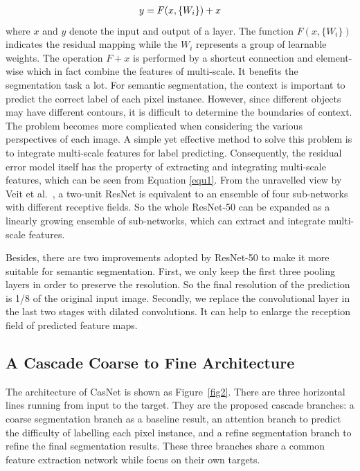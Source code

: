 \documentclass[10.5pt,compsoc]{TsT}
\newcommand{\upcite}[1]{\superscript{\textsuperscript{\cite{#1}}}}
\theoremstyle{mystyle}
\newcommand{\upcite}[1]{\textsuperscript{\cite{#1}}}
\begin{document}
{\begin{equation}\label{equ1}
\setlength\abovedisplayskip{4pt}
\setlength\belowdisplayskip{4pt}
\begin{split}
y = F(x, \{W_{i}\}) + x \\
\end{split}
\end{equation} 
where $x$ and $y$ denote the input and output of a layer. The function $F(x, \{W_{i}\})$ indicates the residual mapping while the $W_{i}$ represents a group of learnable weights. The operation $F + x$ is performed by a shortcut connection and element-wise which in fact combine the features of multi-scale. It benefits the segmentation task a lot. For semantic segmentation,  the context is important to predict the correct label of each pixel instance. However, since different objects may have different contours, it is difficult to determine the boundaries of context. The problem becomes more complicated when considering the various perspectives of each image. A simple yet effective method to solve this problem is to integrate multi-scale features for label predicting. Consequently, the residual error model itself has the property of extracting and integrating multi-scale features, which can be seen from Equation \ref {equ1}. From the unravelled view by Veit et al.~\upcite{22}, a two-unit ResNet is equivalent to an ensemble of four sub-networks with different receptive fields. So the whole ResNet-50 can be expanded as a linearly growing ensemble of sub-networks, which can extract and integrate multi-scale features.

Besides, there are two improvements adopted by ResNet-50 to make it more suitable for semantic segmentation. First, we only keep the first three pooling layers in order to preserve the resolution. So the final resolution of the prediction is 1/8 of the original input image. Secondly, we replace the convolutional layer in the last two stages with dilated convolutions. It can help to enlarge the reception field of predicted feature maps.



\subsection{A Cascade Coarse to Fine Architecture}
\label{s:casnet}
\noindent

The architecture of CasNet is shown as Figure~\ref{fig2}. There are three horizontal lines running from input to the target. They are the proposed cascade branches: a coarse segmentation branch as a baseline result, an attention branch to predict the difficulty of labelling each pixel instance, and a refine segmentation branch to refine the final segmentation results. 
These three branches share a common feature extraction network while focus on their own targets.

}
\end{document}
